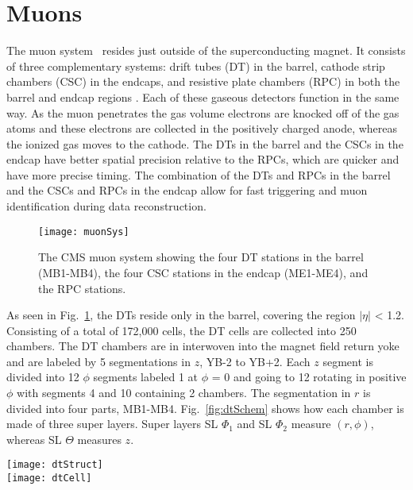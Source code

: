   \section{Muons}
    The muon system~\cite{tCmsE} resides just outside of the superconducting magnet.
    It consists of three complementary systems: drift tubes (DT) in the
      barrel, cathode strip chambers (CSC) in the endcaps, and resistive 
      plate chambers (RPC) in both the barrel and endcap regions \cite{tCmsE}.
    Each of these gaseous detectors function in the same way.
    As the muon penetrates the gas volume electrons are knocked off of the 
      gas atoms and these electrons are collected in the positively charged
      anode, whereas the ionized gas moves to the cathode. 
    The DTs in the barrel and the CSCs in the endcap have better spatial 
      precision relative to the RPCs, which are quicker and have more
      precise timing. 
    The combination of the DTs and RPCs in the barrel and the CSCs and RPCs 
      in the endcap allow for fast triggering and muon identification during
      data reconstruction. 
    \begin{figure}[!Hhbt]
      \centering
      \texttt{[image: muonSys]}
      \caption{ The CMS muon system showing the four DT stations in 
        the barrel (MB1-MB4), the four CSC stations in the endcap (ME1-ME4), 
        and the RPC stations.}
      \label{fig:muonSys}
    \end{figure}

    As seen in Fig.~\ref{fig:muonSys}, the DTs reside only in the barrel, 
      covering the region $|\eta|$ < 1.2.
    Consisting of a total of 172,000 cells, the DT cells are collected into
      250 chambers. 
    The DT chambers are in interwoven into the magnet field return yoke and are
      labeled by 5 segmentations in $z$, YB-2 to YB+2.
    Each $z$ segment is divided into 12 $\phi$ segments labeled 1 at $\phi$ = 0
      and going to 12 rotating in positive $\phi$ with segments 4 and 10 
      containing 2 chambers.
   The segmentation in $r$ is divided into four parts, MB1-MB4.
   Fig.~\ref{fig:dtSchem} shows how each chamber is made of three super layers.
   Super layers SL $\Phi_{1}$ and SL $\Phi_{2}$ measure $(r,\phi)$, whereas 
    SL $\Theta$ measures $z$.
    \begin{figure*}[!Hhbt]
      \centering
      \texttt{[image: dtStruct]} \\
      \texttt{[image: dtCell]}
      \caption{Schematic of the DT chambers and an individual DT cell.}
      \label{fig:dtSchem}
    \end{figure*}

